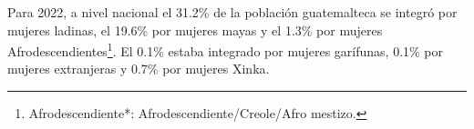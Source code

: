 Para 2022, a nivel nacional el 31.2\% de la población guatemalteca se integró por mujeres ladinas, el 19.6\% por mujeres mayas y el 1.3\% por mujeres Afrodescendientes\footnote{Afrodescendiente*: Afrodescendiente/Creole/Afro mestizo.}. El 0.1\% estaba integrado por mujeres garífunas, 0.1\% por mujeres extranjeras y 0.7\% por mujeres Xinka.